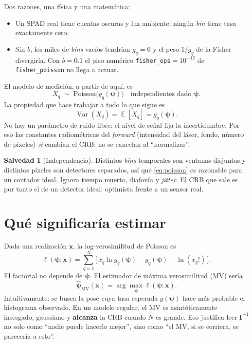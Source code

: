 \documentclass[11pt,a4paper]{article}
\newcommand{\vect}[1]{\boldsymbol{#1}}
\newcommand{\matr}[1]{\mathbf{#1}}
\newcommand{\code}[1]{\texttt{#1}}
\DeclareMathOperator*{\E}{\mathbb{E}}
\theoremstyle{definition}
\newtheorem{salvedad}{Salvedad}
\theoremstyle{plain}
\begin{document}
Dos razones, una f\'isica y una matem\'atica:
%
\begin{itemize}[leftmargin=*]
  \item Un SPAD real tiene cuentas oscuras y luz ambiente; ning\'un \emph{bin}
        tiene tasa exactamente cero.
  \item Sin $b$, los miles de \emph{bins} vac\'ios tendr\'ian $g_q=0$ y el peso
        $1/g_q$ de la Fisher divergir\'ia. Con $b=0.1$ el piso num\'erico
        \code{fisher\_eps}$=10^{-12}$ de \code{fisher\_poisson} no llega a
        actuar.
\end{itemize}

El modelo de medici\'on, a partir de aqu\'i, es
%
\begin{equation}
\label{eq:poisson}
X_q \;\sim\; \mathrm{Poisson}\bigl(g_q(\vect\psi)\bigr)
\quad\text{independientes dado }\vect\psi.
\end{equation}
%
La propiedad que hace trabajar a todo lo que sigue es
%
\begin{equation}
\label{eq:var}
\operatorname{Var}(X_q)=\E[X_q]=g_q(\vect\psi).
\end{equation}
%
No hay un par\'ametro de ruido libre: el nivel de se\~nal fija la
incertidumbre. Por eso las constantes radiom\'etricas del \emph{forward}
(intensidad del l\'aser, fondo, n\'umero de p\'ixeles) \emph{s\'i} cambian el
CRB: no se cancelan al \enquote{normalizar}.

\begin{salvedad}[Independencia]
Distintos \emph{bins} temporales son ventanas disjuntas y distintos p\'ixeles
son detectores separados, as\'i que \eqref{eq:poisson} es razonable para un
contador ideal. Ignora tiempo muerto, diafon\'ia y \emph{jitter}. El CRB que
sale es por tanto el de un detector ideal: optimista frente a un sensor real.
\end{salvedad}

\section{Qu\'e significar\'ia estimar}
\label{sec:estimar}

Dada una realizaci\'on $\vect x$, la log-verosimilitud de Poisson es
%
\begin{equation}
\label{eq:loglik}
\ell(\vect\psi;\vect x)
= \sum_{q=1}^{N}
\bigl[\, x_q \ln g_q(\vect\psi) - g_q(\vect\psi) - \ln(x_q!)\,\bigr].
\end{equation}
%
El factorial no depende de $\vect\psi$. El estimador de m\'axima verosimilitud
(MV) ser\'ia
%
\begin{equation}
\label{eq:mle}
\hat{\vect\psi}_{\mathrm{MV}}(\vect x)
= \arg\max_{\vect\psi}\ell(\vect\psi;\vect x).
\end{equation}
%
Intuitivamente: se busca la pose cuya tasa esperada $g(\vect\psi)$ hace m\'as
probable el histograma observado. En un modelo regular, el MV es asint\'oticamente
insesgado, gaussiano y \textbf{alcanza} la CRB cuando $N$ es grande. Eso
justifica leer $\matr I^{-1}$ no solo como \enquote{nadie puede hacerlo mejor},
sino como \enquote{el MV, si se corriera, se parecer\'ia a esto}.
\end{document}
